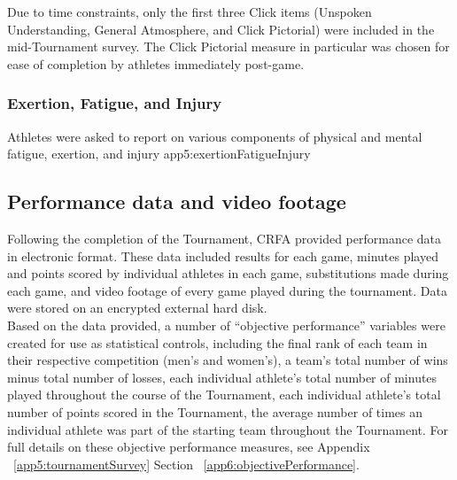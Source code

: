 
Due to time constraints, only the first three Click items (Unspoken Understanding, General Atmosphere, and Click Pictorial) were included in the mid-Tournament survey. The Click Pictorial measure in particular was chosen for ease of completion by athletes immediately post-game. \\






\subsubsection{Exertion, Fatigue, and Injury}
Athletes were asked to report on various components of physical and mental fatigue, exertion, and injury
app5:exertionFatigueInjury





\subsection{Performance data and video footage}
Following the completion of the Tournament, CRFA provided performance data in electronic format. These data included results for each game, minutes played and points scored by individual athletes in each game, substitutions made during each game, and video footage of every game played during the tournament. Data were stored on an encrypted external hard disk. \\

Based on the data provided, a number of ``objective performance'' variables were created for use as statistical controls, including the final rank of each team in their respective competition (men's and women's), a team's total number of wins minus total number of losses, each individual athlete's total number of minutes played throughout the course of the Tournament, each individual athlete's total number of points scored in the Tournament, the average number of times an individual athlete was part of the starting team throughout the Tournament. For full details on these objective performance measures, see Appendix ~\ref{app5:tournamentSurvey} Section ~\ref{app6:objectivePerformance}.







